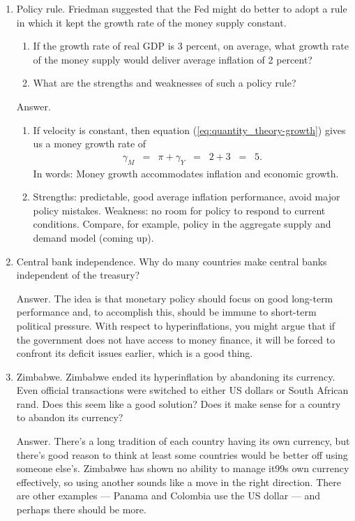 \setlength{\leftmargini}{.5\oldleftmargini}
\begin{enumerate}
\item Policy rule.  Friedman suggested that the Fed might do better to adopt
a rule in which it kept the growth rate of the money supply constant.
\begin{enumerate}
\item If the growth rate of real GDP is 3 percent, on average,
what growth rate of the money supply would deliver
average inflation of 2 percent?
\item What are the strengths and weaknesses of such a policy rule?
\end{enumerate}

Answer.
\begin{enumerate}
\item If velocity is constant, then
equation (\ref{eq:quantity_theory-growth}) gives us
a money growth rate of
\begin{eqnarray*}
    \gamma_M &=& \pi + \gamma_Y
            \;\;=\;\;  2 + 3 \;\;=\;\; 5.
\end{eqnarray*}
In words: Money growth accommodates inflation and economic growth.
\item Strengths: predictable, good average inflation performance,
avoid major policy mistakes.
Weakness: no room for policy to respond to current conditions.
Compare, for example, policy in the aggregate supply and demand model
(coming up).
\end{enumerate}


\item Central bank independence.
Why do many countries make central banks independent of the treasury?

Answer.  The idea is that monetary policy should focus on good long-term
performance and, to accomplish this, should be immune to
short-term political pressure.
With respect to hyperinflations,
you might argue that if the government does not have access to money finance,
it will be forced to confront its deficit issues earlier,
which is a good thing.



\item Zimbabwe.
Zimbabwe ended its hyperinflation by abandoning its currency.
Even official transactions were switched to either US dollars or
    South African rand.
    Does this seem like a good solution?
    Does it make sense for a country to abandon its currency?

Answer.  There's a long tradition of each country having its own currency,
but there's good reason to think at least some countries would be better
off using someone else's.
Zimbabwe has shown no ability to manage it99s own currency effectively,
so using another sounds like a move in the right direction.
There are other examples --- Panama and Colombia use the US dollar --- and perhaps there should be more.


\end{enumerate}
